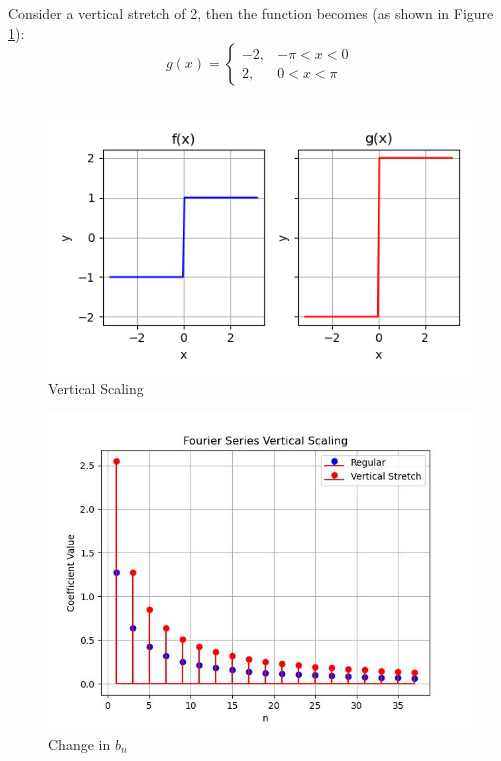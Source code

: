 \documentclass{article}
\begin{document}
Consider a vertical stretch of 2, then the function becomes (as shown in Figure \ref{Vertical Scaling}): 
\begin{equation}
g(x) = 
\begin{cases} 
-2, & -\pi < x < 0 \\
2, & 0 < x < \pi
\end{cases}
\end{equation}\\
\begin{figure}
    \centering
    \includegraphics[width=\textwidth]{vertical_scaling.png}
    \caption{Vertical Scaling}
    \label{Vertical Scaling}
\end{figure}
\begin{figure}
    \centering
    \includegraphics[width=\textwidth]{vertical_stem_stretch.jpg}
    \caption{Change in $b_n$}
    \label{vertical_stem_stretch}
\end{figure}
\end{document}
